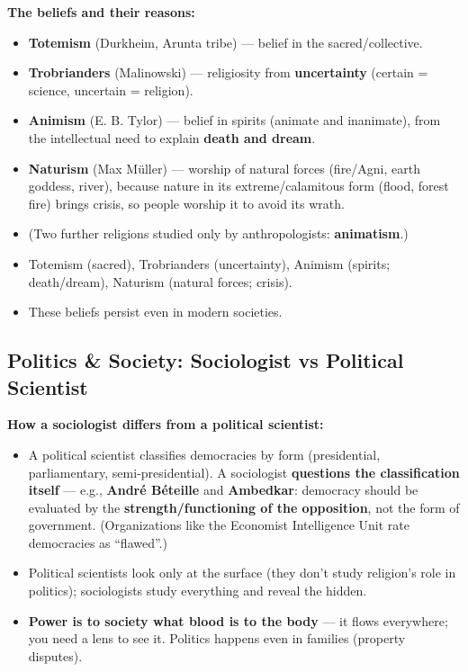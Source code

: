 \begin{DataFact}
\textbf{The beliefs and their reasons:}
\begin{itemize}
\item \textbf{Totemism} (Durkheim, Arunta tribe) --- belief in the sacred/collective.
\item \textbf{Trobrianders} (Malinowski) --- religiosity from \textbf{uncertainty} (certain = science, uncertain = religion).
\item \textbf{Animism} (E. B. Tylor) --- belief in spirits (animate and inanimate), from the intellectual need to explain \textbf{death and dream}.
\item \textbf{Naturism} (Max M\"uller) --- worship of natural forces (fire/Agni, earth goddess, river), because nature in its extreme/calamitous form (flood, forest fire) brings crisis, so people worship it to avoid its wrath.
\item (Two further religions studied only by anthropologists: \textbf{animatism}.)
\end{itemize}
\end{DataFact}

\begin{QuickRevision}
\begin{itemize}
\item Totemism (sacred), Trobrianders (uncertainty), Animism (spirits; death/dream), Naturism (natural forces; crisis).
\item These beliefs persist even in modern societies.
\end{itemize}
\end{QuickRevision}

\sectiondivider

\subsection{Politics \& Society: Sociologist vs Political Scientist}

\begin{CriticalPoint}
\textbf{How a sociologist differs from a political scientist:}
\begin{itemize}
\item A political scientist classifies democracies by form (presidential, parliamentary, semi-presidential). A sociologist \textbf{questions the classification itself} --- e.g., \textbf{Andr\'e B\'eteille} and \textbf{Ambedkar}: democracy should be evaluated by the \textbf{strength/functioning of the opposition}, not the form of government. (Organizations like the Economist Intelligence Unit rate democracies as ``flawed''.)
\item Political scientists look only at the surface (they don't study religion's role in politics); sociologists study everything and reveal the hidden.
\item \textbf{Power is to society what blood is to the body} --- it flows everywhere; you need a lens to see it. Politics happens even in families (property disputes).
\end{itemize}
\end{CriticalPoint}

